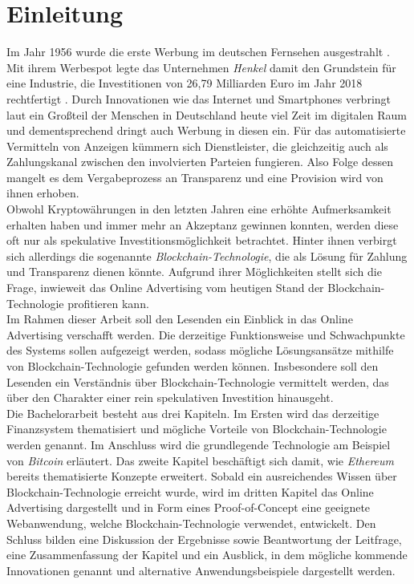 \chapter{Einleitung}
Im Jahr 1956 wurde die erste Werbung im deutschen Fernsehen ausgestrahlt \cite[]{tagesspiegel_2016}. Mit ihrem Werbespot legte das Unternehmen \emph{Henkel} damit den Grundstein für eine Industrie, die Investitionen von 26,79 Milliarden Euro im Jahr 2018 rechtfertigt \cite[]{statista_werbung_2020}. Durch Innovationen wie das Internet und Smartphones verbringt laut \cite{statista_internetnutzung_2020} ein Großteil der Menschen in Deutschland heute viel Zeit im digitalen Raum und dementsprechend dringt auch Werbung in diesen ein. Für das automatisierte Vermitteln von Anzeigen kümmern sich Dienstleister, die gleichzeitig auch als Zahlungskanal zwischen den involvierten Parteien fungieren. Also Folge dessen mangelt es dem Vergabeprozess an Transparenz und eine Provision wird von ihnen erhoben.\\

Obwohl Kryptowährungen in den letzten Jahren eine erhöhte Aufmerksamkeit erhalten haben und immer mehr an Akzeptanz gewinnen konnten, werden diese oft nur als spekulative Investitionsmöglichkeit betrachtet. Hinter ihnen verbirgt sich allerdings die sogenannte \emph{Blockchain-Technologie}, die als Lösung für Zahlung und Transparenz dienen könnte. Aufgrund ihrer Möglichkeiten stellt sich die Frage, inwieweit das Online Advertising vom heutigen Stand der Blockchain-Technologie profitieren kann.\\

Im Rahmen dieser Arbeit soll den Lesenden ein Einblick in das Online Advertising verschafft werden. Die derzeitige Funktionsweise und Schwachpunkte des Systems sollen aufgezeigt werden, sodass mögliche Lösungsansätze mithilfe von Blockchain-Technologie gefunden werden können. Insbesondere soll den Lesenden ein Verständnis über Blockchain-Technologie vermittelt werden, das über den Charakter einer rein spekulativen Investition hinausgeht.\\

Die Bachelorarbeit besteht aus drei Kapiteln. Im Ersten wird das derzeitige Finanzsystem thematisiert und mögliche Vorteile von Blockchain-Technologie werden genannt. Im Anschluss wird die grundlegende Technologie am Beispiel von \emph{Bitcoin} erläutert. Das zweite Kapitel beschäftigt sich damit, wie \emph{Ethereum} bereits thematisierte Konzepte erweitert. Sobald ein ausreichendes Wissen über Blockchain-Technologie erreicht wurde, wird im dritten Kapitel das Online Advertising dargestellt und in Form eines Proof-of-Concept eine geeignete Webanwendung, welche Blockchain-Technologie verwendet, entwickelt. Den Schluss bilden eine Diskussion der Ergebnisse sowie Beantwortung der Leitfrage, eine Zusammenfassung der Kapitel und ein Ausblick, in dem mögliche kommende Innovationen genannt und alternative Anwendungsbeispiele dargestellt werden. 

